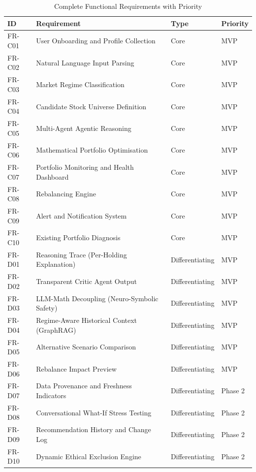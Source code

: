 \documentclass[12pt, a4paper, openany, oneside]{report}
\begin{document}
\begin{table}[H]
\centering
\caption{Complete Functional Requirements with Priority}
\label{tab:allreq}
\begin{tabularx}{\textwidth}{|l|X|l|l|}
\hline
\textbf{ID} & \textbf{Requirement} & \textbf{Type} & \textbf{Priority} \\
\hline
FR-C01 & User Onboarding and Profile Collection & Core & MVP \\
FR-C02 & Natural Language Input Parsing & Core & MVP \\
FR-C03 & Market Regime Classification & Core & MVP \\
FR-C04 & Candidate Stock Universe Definition & Core & MVP \\
FR-C05 & Multi-Agent Agentic Reasoning & Core & MVP \\
FR-C06 & Mathematical Portfolio Optimisation & Core & MVP \\
FR-C07 & Portfolio Monitoring and Health Dashboard & Core & MVP \\
FR-C08 & Rebalancing Engine & Core & MVP \\
FR-C09 & Alert and Notification System & Core & MVP \\
FR-C10 & Existing Portfolio Diagnosis & Core & MVP \\
FR-D01 & Reasoning Trace (Per-Holding Explanation) & Differentiating & MVP \\
FR-D02 & Transparent Critic Agent Output & Differentiating & MVP \\
FR-D03 & LLM-Math Decoupling (Neuro-Symbolic Safety) & Differentiating & MVP \\
FR-D04 & Regime-Aware Historical Context (GraphRAG) & Differentiating & MVP \\
FR-D05 & Alternative Scenario Comparison & Differentiating & MVP \\
FR-D06 & Rebalance Impact Preview & Differentiating & MVP \\
FR-D07 & Data Provenance and Freshness Indicators & Differentiating & Phase 2 \\
FR-D08 & Conversational What-If Stress Testing & Differentiating & Phase 2 \\
FR-D09 & Recommendation History and Change Log & Differentiating & Phase 2 \\
FR-D10 & Dynamic Ethical Exclusion Engine & Differentiating & Phase 2 \\
\hline
\end{tabularx}
\end{table}
\end{document}
